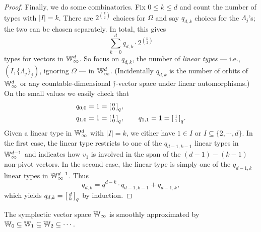 \begin{proof}
    Finally, we do some combinatorics.
    Fix $0 \leq k \leq d$ and count the number of types with $|I| = k$.
    There are $2^{\binom{k}{2}}$ choices for $\Omega$ and say $q_{d, k}$ choices for the $\Lambda_j$'s;
    the two can be chosen separately.
    In total, this gives
    \[ 
        \sum_{k=0}^d q_{d,k} \cdot 2^{\binom{k}{2}}
    \]
    types for vectors in $\mathbb{W}_\infty^d$.
    So focus on $q_{d,k}$, the number of \emph{linear types} --- i.e., $(I, \{\Lambda_j\}_j)$, ignoring $\Omega$ --- in $\mathbb{W}_\infty^d$.
    (Incidentally $q_{d,k}$ is the number of orbits of $\mathbb{W}_\infty^d$ or any countable-dimensional $\mathfrak{f}$-vector space under linear automorphisms.)
    On the small values we easily check that \begin{align*}
        &q_{0,0} = 1 = \begin{bsmallmatrix}0 \\ 0\end{bsmallmatrix}_q, \\
        &q_{1,0} = 1 = \begin{bsmallmatrix}1 \\ 0\end{bsmallmatrix}_q,\qquad
        q_{1,1} = 1 = \begin{bsmallmatrix}1 \\ 1\end{bsmallmatrix}_q.
    \end{align*}
    Given a linear type in $\mathbb{W}_\infty^d$ with $\vert I \vert = k$, 
    we either have $1 \in I$ or $I \subseteq \{2, \cdots, d\}$.
    In the first case, the linear type restricts to one of the $q_{d-1, k-1}$ linear types in $\mathbb{W}_\infty^{d-1}$
    and indicates how $v_1$ is involved in the span of the $(d - 1) - (k - 1)$ non-pivot vectors.
    In the second case, the linear type is simply one of the $q_{d-1, k}$ linear types in $\mathbb{W}_\infty^{d-1}$.
    Thus 
    \[
        q_{d, k} = q^{d-k} \cdot q_{d-1, k-1} + q_{d-1, k},
    \]
    which yields $q_{d, k} = \begin{bsmallmatrix}d \\ k\end{bsmallmatrix}_q$ by induction.
\end{proof}

\begin{theorem}\label{thm:symplectic-smooth-approximation}
    The symplectic vector space $\mathbb{W}_\infty$ is smoothly approximated by 
    $\mathbb{W}_0 \subseteq \mathbb{W}_1 \subseteq \mathbb{W}_2 \subseteq \cdots$.
\end{theorem}

